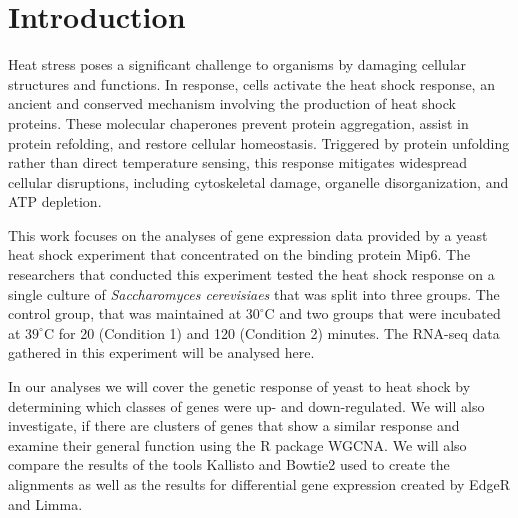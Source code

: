 \chapter{Introduction}
Heat stress poses a significant challenge to organisms by damaging cellular 
structures and functions. In response, cells activate the heat shock response, 
an ancient and conserved mechanism involving the production of heat shock proteins. 
These molecular chaperones prevent protein aggregation, assist in protein refolding, 
and restore cellular homeostasis. Triggered by protein unfolding rather than direct 
temperature sensing, this response mitigates widespread cellular disruptions, 
including cytoskeletal damage, organelle disorganization, and ATP depletion. 
\cite{richter_heat_2010}

This work focuses on the analyses of gene expression data provided by a yeast 
heat shock experiment that concentrated 
on the binding protein Mip6. The researchers 
that conducted this experiment tested the heat shock response on a single 
culture of \textit{Saccharomyces cerevisiaes} that was split into three groups. 
The control group, that was maintained at $30^\circ\text{C}$ and two groups 
that were incubated at $39^\circ\text{C}$ for 20 (Condition 1) and 120 (Condition 2)
minutes. The RNA-seq data gathered in this experiment will be analysed here. 
\cite{nuno-cabanes_multi-omics_2020}

In our analyses we will cover the genetic response of yeast to heat shock by 
determining which classes of genes were up- and down-regulated. We will also 
investigate, if there are clusters of genes that show a similar response and examine 
their general function using the R package WGCNA. We will also compare the results 
of the tools Kallisto and Bowtie2 used to create the alignments as well as the 
results for differential gene expression created by EdgeR and Limma.


